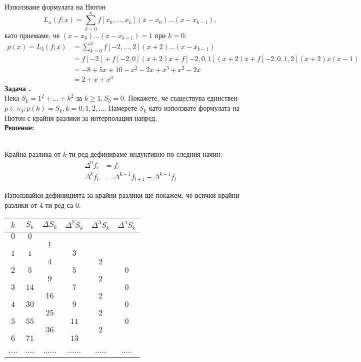 \documentclass[12pt]{article}
\newcounter{problem}
\newcounter{solution}
\newcommand\problem{%
  \stepcounter{problem}%
  \textbf{Задача \theproblem.}~%
  \\
}
\newcommand\solution{%
  \textbf{Решение:}\\~%
}
\begin{document}
        Използваме формулата на Нютон
        \begin{equation*}
        L_n(f;x) = \sum_{k=0}^nf[x_0,\dotso,x_k](x-x_0)\dotso(x-x_{k-1}),
        \end{equation*}
        като приемаме, че $(x-x_0)\dotso(x-x_{k-1}) = 1$ при $k=0$.
        \begin{align*}
        p(x)=L_3(f;x) &= \sum_{k=0}^3f[-2,\dotso,2](x+2)\dotso(x-x_{k-1})\\
        &=f[-2]+f[-2,0](x+2)x+f[-2,0,1](x+2)x+f[-2,0,1,2](x+2)x(x-1)\\
        &= -8 + 5x+10-x^2-2x+x^3+x^2-2x \\
        &= \boxed{2+x+x^3}
        \end{align*}
    \problem
        Нека $S_k=1^2+\ldots+k^2$ за $k\geq1, S_0=0$. Покажете, че съществува единствен $p\in\pi_3:p(k)=S_k, k=0,1,2,\ldots$. Намерете $S_k$ като използвате формулата на Нютон с крайни разлики за интерполация напред.\\
    \solution
        \begin{tcolorbox}[colback=red!5!white,colframe=red!75!black]
        Крайна разлика от $k$-ти ред дефинираме индуктивно по следния начин:
        \begin{align*}
        \Delta^0f_i&=f_i\\
        \Delta^kf_i&=\Delta^{k-1}f_{i+1}-\Delta^{k-1}f_i
        \end{align*}
        \end{tcolorbox}
        Използвайки дефиницията за крайни разлики ще покажем, че всички крайни разлики от 4-ти ред са 0.\\
        \begin{tabular}{|c c c c c c|}
        \hline
        $k$&$S_k$&$\Delta S_k$&$\Delta^2S_k$&$\Delta^3S_k$&$\Delta^4S_k$\\
        \hline
        $0$ & $0$  &      &      &     &     \\
            &      & $1$  &      &     &     \\
        $1$ & $1$  &      & $3$  &     &     \\
            &      & $4$  &      & $2$ &     \\
        $2$ & $5$  &      & $5$  &     & $0$ \\
            &      & $9$  &      & $2$ &     \\
        $3$ & $14$ &      & $7$  &     & $0$ \\
            &      & $16$ &      & $2$ &     \\
        $4$ & $30$ &      & $9$  &     & $0$ \\
            &      & $25$ &      & $2$ &     \\
        $5$ & $55$ &      & $11$ &     & $0$ \\
            &      & $36$ &      & $2$ &     \\
        $6$ & $71$ &      & $13$ &     &     \\
        ....& .... &......&......&.....&.....\\
        \hline
        \end{tabular}\\
\end{document}
